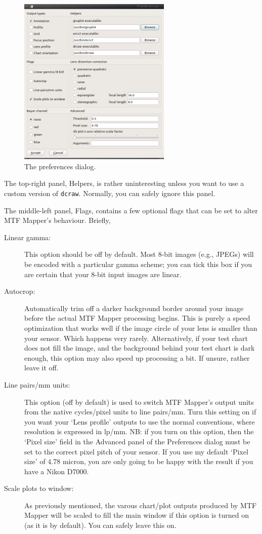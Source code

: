 \documentclass[a4paper]{article}
\begin{document}
\begin{figure}[ht!]
\centering
\includegraphics[width=0.65\textwidth]{figures/settings}
\caption{The preferences dialog.}
\label{fig:settings}
\end{figure}

The top-right panel, \textsf{Helpers}, is rather uninteresting unless you
want to use a custom version of \texttt{dcraw}. Normally, you can safely
ignore this panel.

The middle-left panel, \textsf{Flags}, contains a few optional flags that
can be set to alter MTF Mapper's behaviour. Briefly,
\begin{description}
\item[Linear gamma:] This option should be off by default. Most 8-bit images
(e.g., JPEGs) will be encoded with a particular gamma scheme; you can tick
this box if you are certain that your 8-bit input images are linear.
\item[Autocrop:] Automatically trim off a darker background border around your image
before the actual MTF Mapper processing begins. This is purely a speed
optimization that works well if the image circle of your lens is smaller
than your sensor. Which happens very rarely. Alternatively, if your test
chart does not fill the image, and the background behind your test chart is
dark enough, this option may also speed up processing a bit. If unsure,
rather leave it off.
\item[Line pairs/mm units:] This option (off by default) is used to switch
MTF Mapper's output units from the native cycles/pixel units to line
pairs/mm. Turn this setting on if you want your `Lens profile'
outputs to use the normal conventions, where resolution is expressed in
lp/mm. NB: if you turn on this option, then the `Pixel size' field in the
\textsf{Advanced} panel of the \textsf{Preferences} dialog must be set to
the correct pixel pitch of your sensor. If you use my default `Pixel size'
of 4.78 micron, you are only going to be happy with the result if you have a
Nikon D7000.
\item[Scale plots to window:] As previously mentioned, the varous
chart/plot outputs produced by MTF Mapper will be scaled to fill the main
window if this option is turned on (as it is by default). You can safely
leave this on.
\end{description}
\end{document}
